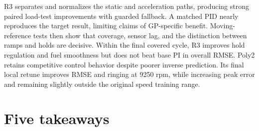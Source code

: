 R3 separates and normalizes the static and acceleration paths, producing strong paired load-test improvements with guarded fallback. A matched PID nearly reproduces the target result, limiting claims of GP-specific benefit. Moving-reference tests then show that coverage, sensor lag, and the distinction between ramps and holds are decisive. Within the final covered cycle, R3 improves hold regulation and fuel smoothness but does not beat base PI in overall RMSE. Poly2 retains competitive control behavior despite poorer inverse prediction. Its final local retune improves RMSE and ringing at 9250 rpm, while increasing peak error and remaining slightly outside the original speed training range.

\section{Five takeaways}
